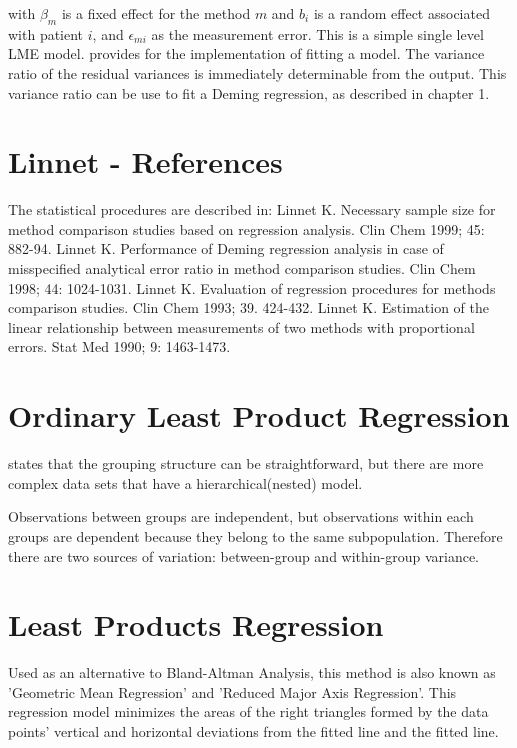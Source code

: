 \documentclass[12pt, a4paper]{report}
\theoremstyle{plain}
\theoremstyle{definition}
\theoremstyle{remark}
\begin{document}
with $\beta_{m}$ is a fixed effect for the method $m$ and $b_{i}$ is a random effect associated with patient $i$, and
$\epsilon_{mi}$ as the measurement error. This is a simple single level LME model. \citet{pb} provides for the implementation of fitting a model. The variance ratio of the residual variances is immediately determinable from the output. This variance ratio can be use to fit a Deming regression, as described in chapter 1.






\section{Linnet - References}
The statistical procedures are described in:
Linnet K. Necessary sample size for method comparison studies based on regression analysis. Clin Chem 1999; 45: 882-94.
Linnet K. Performance of Deming regression analysis in case of misspecified analytical error ratio in method comparison studies. Clin Chem 1998; 44: 1024-1031.
Linnet K. Evaluation of regression procedures for methods comparison studies. Clin Chem 1993; 39. 424-432.
Linnet K. Estimation of the linear relationship between measurements of two methods with proportional errors. Stat Med 1990; 9: 1463-1473.








\section{Ordinary Least Product Regression}
\citet{ludbrook97} states that the grouping structure can be
straightforward, but there are more complex data sets that have a hierarchical(nested) model.

Observations between groups are independent, but observations
within each groups are dependent because they belong to the same
subpopulation. Therefore there are two sources of variation:
between-group and within-group variance.




\section{Least Products Regression}
Used as an alternative to Bland-Altman Analysis, this method is also known as 'Geometric Mean Regression' and 'Reduced Major Axis Regression'. This regression model minimizes the areas of the right triangles formed by the data points' vertical and horizontal deviations from the fitted line and the fitted line.
\end{document}
